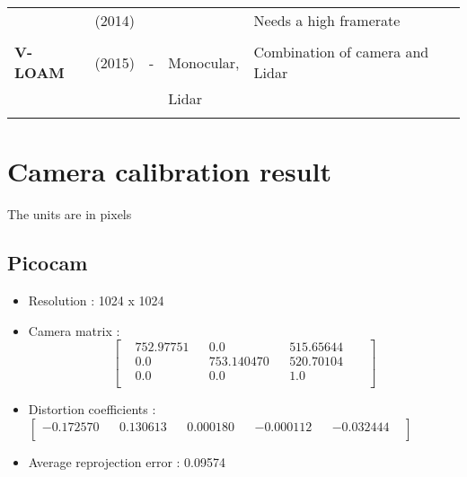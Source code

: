 {\begin{longtable}{l|l|l|l|l}
			& \cite{Forster2014ICRA} (2014)        &                                                                    &                       & Needs a high framerate\\
			&                                   &                                                                    &                       &\\
			\textbf{V-LOAM}        & \cite{Zhang2015} (2015)           & -                                                                  & Monocular,            & Combination of camera and Lidar\\
			&                                   &                                                                    & Lidar                 &\\
			&                                   &                                                                    &                       &\\
		\end{longtable}				
		\newpage
	
\section{Camera calibration result}
\label{section:A.2}
The units are in pixels
\subsection{Picocam}

\begin{itemize}
	\setlength\itemsep{1em}
	\item Resolution : 1024 x 1024
	\item Camera matrix : 
	      \begin{equation*}     
			\begin{bmatrix}
				& 752.97751 & & 0.0 & &  515.65644 & &  \\
				& 0.0 & & 753.140470 & &520.70104  & &\\
				& 0.0 & & 0.0 & &   1.0  & &\\
			\end{bmatrix}
			 \end{equation*}
	\item Distortion coefficients : 
	$ \begin{bmatrix}  
	 	  -0.172570    & & 0.130613  & & 0.000180   &  &-0.000112  & & -0.032444 & \\
	 \end{bmatrix} $ 
	\item Average reprojection error : 0.09574
\end{itemize}
\vspace{10mm}
}
